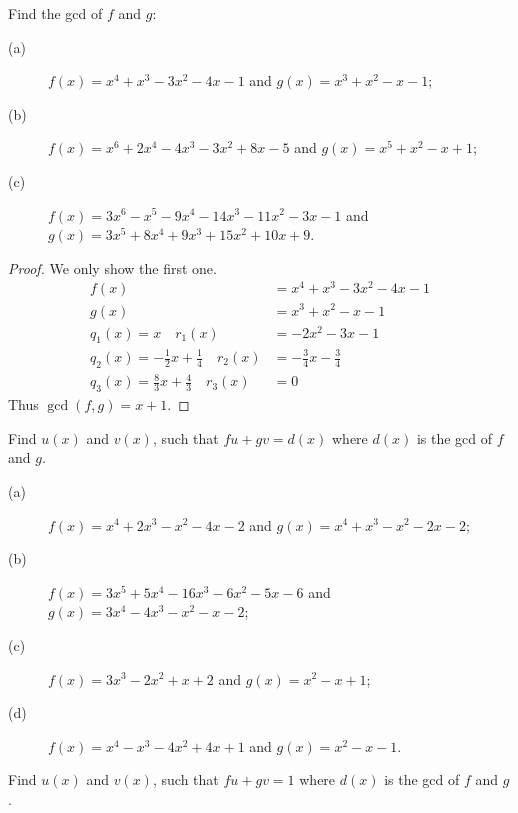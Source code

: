 \begin{pro}%
	Find the gcd of $f$ and $g$:
	\begin{description}
	\item[(a)] $f(x)=x^4+x^3-3x^2-4x-1$ and $g(x)=x^3+x^2-x-1$;
	\item[(b)] $f(x)=x^6+2x^4-4x^3-3x^2+8x-5$ and $g(x)=x^5+x^2-x+1$;
	\item[(c)] $f(x)=3x^6-x^5-9x^4-14x^3-11x^2-3x-1$ and $g(x)=3x^5+8x^4+9x^3+15x^2+10x+9$.
	\end{description}
\end{pro}
\begin{proof}
	We only show the first one.
	\begin{align*}
	f(x)&=x^4+x^3-3x^2-4x-1\\
	g(x)&=x^3+x^2-x-1\\
	q_1(x)=x\quad r_1(x)&=-2x^2-3x-1\\
	q_2(x)=-\frac{1}{2}x+\frac{1}{4}\quad r_2(x)&=-\frac{3}{4}x-\frac{3}{4}\\
	q_3(x)=\frac{8}{3}x+\frac{4}{3}\quad r_3(x)&=0
	\end{align*}
	Thus $\gcd(f,g)=x+1$.
\end{proof}

\begin{pro}%
	Find $u(x)$ and $v(x)$, such that $fu+gv=d(x)$ where $d(x)$ is the gcd of $f$ and $g$.
	\begin{description}
	\item[(a)] $f(x)=x^4+2x^3-x^2-4x-2$ and $g(x)=x^4+x^3-x^2-2x-2$;
	\item[(b)] $f(x)=3x^5+5x^4-16x^3-6x^2-5x-6$ and $g(x)=3x^4-4x^3-x^2-x-2$;
	\item[(c)] $f(x)=3x^3-2x^2+x+2$ and $g(x)=x^2-x+1$;
	\item[(d)] $f(x)=x^4-x^3-4x^2+4x+1$ and $g(x)=x^2-x-1$.
	\end{description}
\end{pro}

\begin{pro}%
	Find $u(x)$ and $v(x)$, such that $fu+gv=1$ where $d(x)$ is the gcd of $f$ and $g$.
\end{pro}


